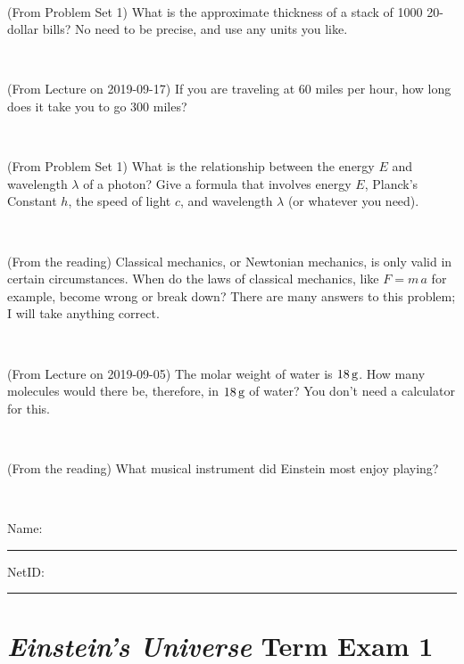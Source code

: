 \documentclass[12pt, letterpaper]{article}
\begin{document}
\vfill ~

\begin{problem} (From Problem Set 1)
What is the approximate thickness of a stack of 1000 20-dollar bills?
No need to be precise, and use any units you like.
\end{problem}


\vfill ~

\begin{problem} (From Lecture on 2019-09-17)
If you are traveling at 60 miles per hour, how long does
it take you to go 300 miles?
\end{problem}


\vfill ~


\clearpage


\begin{problem} (From Problem Set 1)
What is the relationship between the energy $E$ and wavelength
$\lambda$ of a photon? Give a formula that involves energy $E$,
Planck's Constant $h$, the speed of light $c$, and wavelength
$\lambda$ (or whatever you need).
\end{problem}

\vfill ~

\begin{problem} (From the reading)
Classical mechanics, or Newtonian mechanics, is only valid in certain
circumstances. When do the laws of classical mechanics, like $F =
m\,a$ for example, become wrong or break down? There are many answers
to this problem; I will take anything correct.
\end{problem}


\vfill ~

\begin{problem} (From Lecture on 2019-09-05)
The molar weight of water is $18\,\mathrm{g}$. How many molecules would there
be, therefore, in $18\,\mathrm{g}$ of water? You don't need a calculator for
this.
\end{problem}


\vfill ~

\begin{problem} (From the reading)
What musical instrument did Einstein most enjoy playing?
\end{problem}


\vfill ~


\cleardoublepage



\noindent
Name: \rule[-1ex]{0.60\textwidth}{0.1pt}
NetID: \rule[-1ex]{0.20\textwidth}{0.1pt}

\section*{\textsl{Einstein's Universe} Term Exam 1}
\setcounter{problem}{1}
\end{document}
